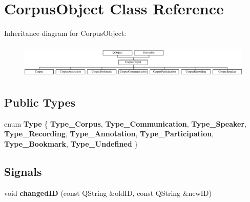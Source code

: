 \hypertarget{class_corpus_object}{}\section{Corpus\+Object Class Reference}
\label{class_corpus_object}
Inheritance diagram for Corpus\+Object\+:\begin{figure}[H]
\begin{center}
\leavevmode
\includegraphics[height=1.643836cm]{class_corpus_object}
\end{center}
\end{figure}
\subsection*{Public Types}
\begin{DoxyCompactItemize}
\item 
\mbox{\label{class_corpus_object_ab1f215448ffcef87c0c49aeef66db14a}} 
enum {\bfseries Type} \{ \newline
{\bfseries Type\+\_\+\+Corpus}, 
{\bfseries Type\+\_\+\+Communication}, 
{\bfseries Type\+\_\+\+Speaker}, 
{\bfseries Type\+\_\+\+Recording}, 
\newline
{\bfseries Type\+\_\+\+Annotation}, 
{\bfseries Type\+\_\+\+Participation}, 
{\bfseries Type\+\_\+\+Bookmark}, 
{\bfseries Type\+\_\+\+Undefined}
 \}
\end{DoxyCompactItemize}
\subsection*{Signals}
\begin{DoxyCompactItemize}
\item 
\mbox{\label{class_corpus_object_aa2aa622291fe174695e2df7b3fe209f6}} 
void {\bfseries changed\+ID} (const Q\+String \&old\+ID, const Q\+String \&new\+ID)
\end{DoxyCompactItemize}
